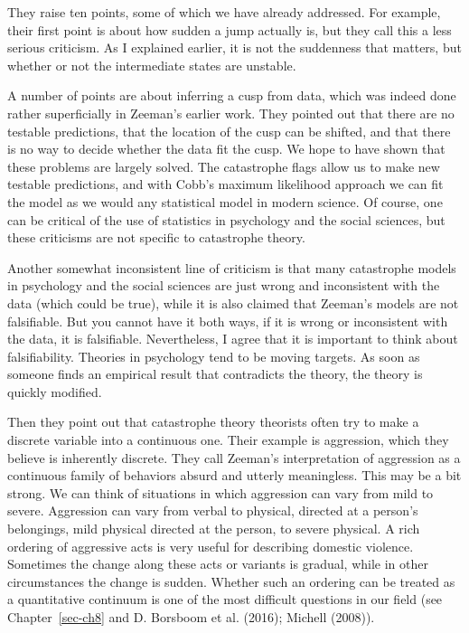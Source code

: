 \documentclass[
  a4paper,
  DIV=11,
  numbers=noendperiod]{scrreprt}
\begin{document}
They raise ten points, some of which we have already addressed. For
example, their first point is about how sudden a jump actually is, but
they call this a less serious criticism. As I explained earlier, it is
not the suddenness that matters, but whether or not the intermediate
states are unstable.

A number of points are about inferring a cusp from data, which was
indeed done rather superficially in Zeeman's earlier work. They pointed
out that there are no testable predictions, that the location of the
cusp can be shifted, and that there is no way to decide whether the data
fit the cusp. We hope to have shown that these problems are largely
solved. The catastrophe flags allow us to make new testable predictions,
and with Cobb's maximum likelihood approach we can fit the model as we
would any statistical model in modern science. Of course, one can be
critical of the use of statistics in psychology and the social sciences,
but these criticisms are not specific to catastrophe theory.

Another somewhat inconsistent line of criticism is that many catastrophe
models in psychology and the social sciences are just wrong and
inconsistent with the data (which could be true), while it is also
claimed that Zeeman's models are not falsifiable. But you cannot have it
both ways, if it is wrong or inconsistent with the data, it is
falsifiable. Nevertheless, I agree that it is important to think about
falsifiability. Theories in psychology tend to be moving targets. As
soon as someone finds an empirical result that contradicts the theory,
the theory is quickly modified.

Then they point out that catastrophe theory theorists often try to make
a discrete variable into a continuous one. Their example is aggression,
which they believe is inherently discrete. They call Zeeman's
interpretation of aggression as a continuous family of behaviors absurd
and utterly meaningless. This may be a bit strong. We can think of
situations in which aggression can vary from mild to severe. Aggression
can vary from verbal to physical, directed at a person's belongings,
mild physical directed at the person, to severe physical. A rich
ordering of aggressive acts is very useful for describing domestic
violence. Sometimes the change along these acts or variants is gradual,
while in other circumstances the change is sudden. Whether such an
ordering can be treated as a quantitative continuum is one of the most
difficult questions in our field (see Chapter~\ref{sec-ch8} and D.
Borsboom et al. (2016); Michell (2008)).
\end{document}
